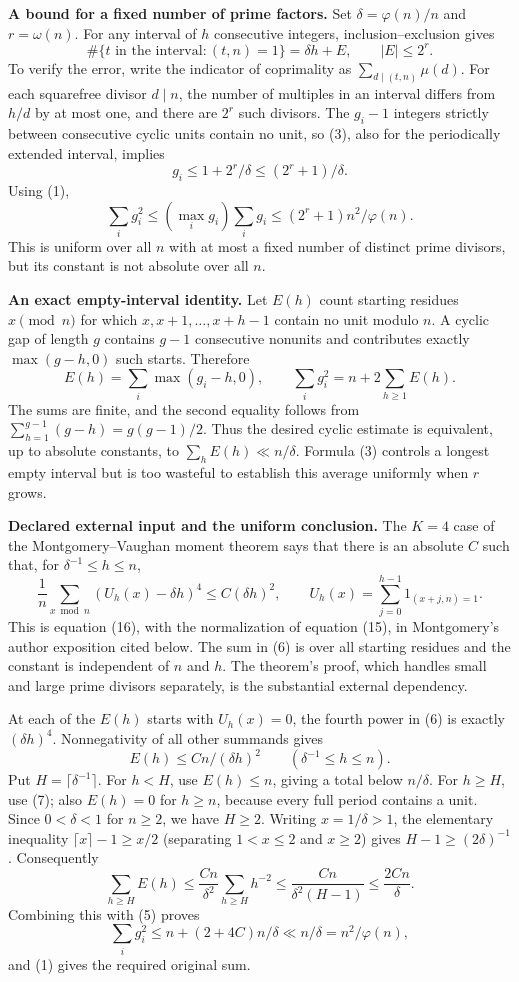 \textbf{A bound for a fixed number of prime factors.} Set $\delta=\varphi(n)/n$ and $r=\omega(n)$. For any interval of $h$ consecutive integers, inclusion--exclusion gives
\[
\#\{t\text{ in the interval}:(t,n)=1\}
=\delta h+E,\qquad |E|\leq2^r.
\tag{3}
\]
To verify the error, write the indicator of coprimality as $\sum_{d\mid(t,n)}\mu(d)$. For each squarefree divisor $d\mid n$, the number of multiples in an interval differs from $h/d$ by at most one, and there are $2^r$ such divisors. The $g_i-1$ integers strictly between consecutive cyclic units contain no unit, so (3), also for the periodically extended interval, implies
\[
g_i\leq1+2^r/\delta\leq(2^r+1)/\delta.
\]
Using (1),
\[
\sum_i g_i^2\leq(\max_i g_i)\sum_i g_i
\leq(2^r+1)n^2/\varphi(n).
\tag{4}
\]
This is uniform over all $n$ with at most a fixed number of distinct prime divisors, but its constant is not absolute over all $n$.

\textbf{An exact empty-interval identity.} Let $E(h)$ count starting residues $x\pmod n$ for which $x,x+1,\ldots,x+h-1$ contain no unit modulo $n$. A cyclic gap of length $g$ contains $g-1$ consecutive nonunits and contributes exactly $\max(g-h,0)$ such starts. Therefore
\[
E(h)=\sum_i\max(g_i-h,0),\qquad
\sum_i g_i^2=n+2\sum_{h\geq1}E(h).
\tag{5}
\]
The sums are finite, and the second equality follows from $\sum_{h=1}^{g-1}(g-h)=g(g-1)/2$. Thus the desired cyclic estimate is equivalent, up to absolute constants, to $\sum_hE(h)\ll n/\delta$. Formula (3) controls a longest empty interval but is too wasteful to establish this average uniformly when $r$ grows.

\textbf{Declared external input and the uniform conclusion.} The $K=4$ case of the Montgomery--Vaughan moment theorem says that there is an absolute $C$ such that, for $\delta^{-1}\leq h\leq n$,
\[
\frac1n\sum_{x\bmod n}\left(U_h(x)-\delta h\right)^4
\leq C(\delta h)^2,
\qquad U_h(x)=\sum_{j=0}^{h-1}1_{(x+j,n)=1}.
\tag{6}
\]
This is equation (16), with the normalization of equation (15), in Montgomery's author exposition cited below. The sum in (6) is over all starting residues and the constant is independent of $n$ and $h$. The theorem's proof, which handles small and large prime divisors separately, is the substantial external dependency.

At each of the $E(h)$ starts with $U_h(x)=0$, the fourth power in (6) is exactly $(\delta h)^4$. Nonnegativity of all other summands gives
\[
E(h)\leq Cn/(\delta h)^2\qquad(\delta^{-1}\leq h\leq n).
\tag{7}
\]
Put $H=\lceil\delta^{-1}\rceil$. For $h<H$, use $E(h)\leq n$, giving a total below $n/\delta$. For $h\geq H$, use (7); also $E(h)=0$ for $h\geq n$, because every full period contains a unit. Since $0<\delta<1$ for $n\geq2$, we have $H\geq2$. Writing $x=1/\delta>1$, the elementary inequality $\lceil x\rceil-1\geq x/2$ (separating $1<x\leq2$ and $x\geq2$) gives $H-1\geq(2\delta)^{-1}$. Consequently
\[
\sum_{h\geq H}E(h)
\leq\frac{Cn}{\delta^2}\sum_{h\geq H}h^{-2}
\leq\frac{Cn}{\delta^2(H-1)}
\leq\frac{2Cn}{\delta}.
\]
Combining this with (5) proves
\[
\sum_i g_i^2\leq n+(2+4C)n/\delta
\ll n/\delta=n^2/\varphi(n),
\]
and (1) gives the required original sum.

